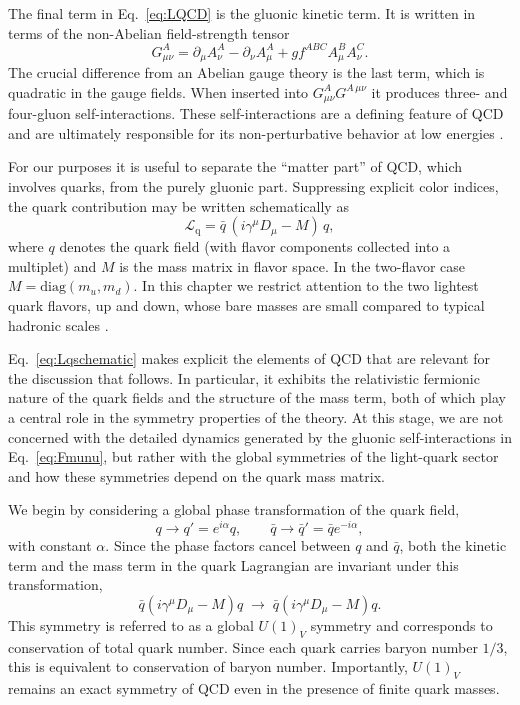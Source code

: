 The final term in Eq.~\eqref{eq:LQCD} is the gluonic kinetic term. It
is written in terms of the non-Abelian field-strength tensor
\begin{equation}
G^A_{\mu\nu}
= \partial_\mu A_\nu^A - \partial_\nu A_\mu^A
+ g f^{ABC} A_\mu^B A_\nu^C .
\label{eq:Fmunu}
\end{equation}
The crucial difference from an Abelian gauge theory is the last term,
which is quadratic in the gauge fields. When inserted into
$G^A_{\mu\nu}G^{A\,\mu\nu}$ it produces three- and four-gluon
self-interactions. These self-interactions are a defining feature of
QCD and are ultimately responsible for its non-perturbative
behavior at low energies \cite{PeskinSchroeder1995,Weinberg1995}.

For our purposes it is useful to separate the ``matter part'' of QCD,
which involves quarks, from the purely gluonic part. Suppressing
explicit color indices, the quark contribution may be written
schematically as
\begin{equation}
\mathcal{L}_{\mathrm{q}}
= \bar{q}\,(i\gamma^\mu D_\mu - M)\,q,
\label{eq:Lqschematic}
\end{equation}
where $q$ denotes the quark field (with flavor components collected
into a multiplet) and $M$ is the mass matrix in flavor space. In the
two-flavor case $M=\mathrm{diag}(m_u,m_d)$. In this chapter we restrict
attention to the two lightest quark flavors, up and down, whose
bare masses are small compared to typical hadronic scales
\cite{PeskinSchroeder1995}.

Eq.~\eqref{eq:Lqschematic} makes explicit the elements of QCD that
are relevant for the discussion that follows. In particular, it
exhibits the relativistic fermionic nature of the quark fields and the
structure of the mass term, both of which play a central role in the
symmetry properties of the theory. At this stage, we are not concerned
with the detailed dynamics generated by the gluonic self-interactions
in Eq.~\eqref{eq:Fmunu}, but rather with the global symmetries of the
light-quark sector and how these symmetries depend on the quark mass
matrix.

We begin by considering a global phase transformation of the quark
field,
\begin{equation}
q \rightarrow q' = e^{i\alpha} q ,
\qquad
\bar q \rightarrow \bar q' = \bar q e^{-i\alpha},
\label{eq:U1V}
\end{equation}
with constant $\alpha$. Since the phase factors cancel between $q$ and
$\bar q$, both the kinetic term and the mass term in the quark
Lagrangian are invariant under this transformation,
\begin{equation}
\bar q (i\gamma^\mu D_\mu - M) q
\;\longrightarrow\;
\bar q (i\gamma^\mu D_\mu - M) q .
\end{equation}
This symmetry is referred to as a global $U(1)_V$ symmetry and
corresponds to conservation of total quark number. Since each quark
carries baryon number $1/3$, this is equivalent to conservation of
baryon number. Importantly, $U(1)_V$ remains an exact
symmetry of QCD even in the presence of finite quark masses.

